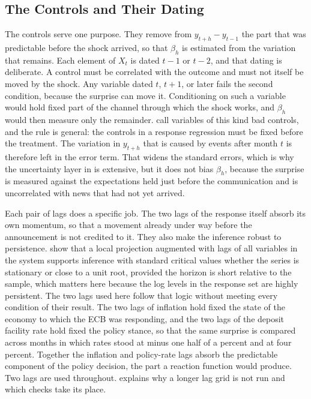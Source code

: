 \subsection{The Controls and Their Dating}
\label{sec:controls-dating}

The controls serve one purpose. They remove from \(y_{t+h} - y_{t-1}\) the part that was predictable before the shock arrived, so that \(\beta_h\) is estimated from the variation that remains. Each element of \(X_t\) is dated \(t-1\) or \(t-2\), and that dating is deliberate. A control must be correlated with the outcome and must not itself be moved by the shock. Any variable dated \(t\), \(t+1\), or later fails the second condition, because the surprise can move it. Conditioning on such a variable would hold fixed part of the channel through which the shock works, and \(\beta_h\) would then measure only the remainder. \textcite{AngristPischke2009} call variables of this kind bad controls, and the rule is general: the controls in a response regression must be fixed before the treatment. The variation in \(y_{t+h}\) that is caused by events after month \(t\) is therefore left in the error term. That widens the standard errors, which is why the uncertainty layer in  is extensive, but it does not bias \(\beta_h\), because the surprise is measured against the expectations held just before the communication and is uncorrelated with news that had not yet arrived.

Each pair of lags does a specific job. The two lags of the response itself absorb its own momentum, so that a movement already under way before the announcement is not credited to it. They also make the inference robust to persistence. \textcite{MontielOleaPlagborgMoller2021} show that a local projection augmented with lags of all variables in the system supports inference with standard critical values whether the series is stationary or close to a unit root, provided the horizon is short relative to the sample, which matters here because the log levels in the response set are highly persistent. The two lags used here follow that logic without meeting every condition of their result. The two lags of inflation hold fixed the state of the economy to which the ECB was responding, and the two lags of the deposit facility rate hold fixed the policy stance, so that the same surprise is compared across months in which rates stood at minus one half of a percent and at four percent. Together the inflation and policy-rate lags absorb the predictable component of the policy decision, the part a reaction function would produce. Two lags are used throughout.  explains why a longer lag grid is not run and which checks take its place.

